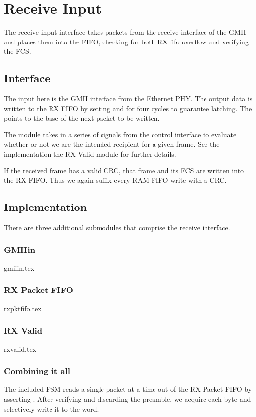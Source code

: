 \section{Receive Input}

The receive input interface takes packets from the receive interface
of the GMII and places them into the FIFO, checking for both RX fifo
overflow and verifying the FCS.

\subsection{Interface}
The input here is the GMII interface from the Ethernet PHY. The output
data is written to the RX FIFO by setting  and
 for four cycles to guarantee latching. The
 points to the base of the
next-packet-to-be-written.

The module takes in a series of signals from the control interface to
evaluate whether or not we are the intended recipient for a given
frame. See the implementation the RX Valid module for further details. 

If the received frame has a valid CRC, that frame and its FCS are
written into the RX FIFO. Thus we again suffix every RAM FIFO write
with a CRC.


\subsection{Implementation}

There are three additional submodules that comprise the receive interface. 

\subsubsection{GMIIin}
{gmiiin.tex}

\subsubsection{RX Packet FIFO} 
{rxpktfifo.tex}

\subsubsection{RX Valid}
{rxvalid.tex}


\subsubsection{Combining it all}
The included FSM reads a single packet at a time out of the RX Packet
FIFO by asserting . After verifying and discarding the
preamble, we acquire each byte and selectively write it to the
 word.


